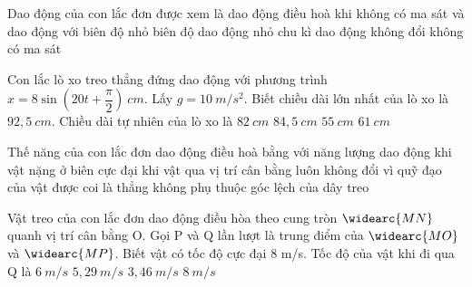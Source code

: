	\begin{ex} %
		Dao động của con lắc đơn được xem là dao động điều hoà khi
		\choice
		{\True không có ma sát và dao động với biên độ nhỏ}
		{biên độ dao động nhỏ}
		{chu kì dao động không đổi}
		{không có ma sát}
	\end{ex}
	\begin{ex}%
		Con lắc lò xo treo thẳng đứng dao động với phương trình $x=8\sin \left( 20t+\dfrac{\pi}{2} \right)\ cm.$ Lấy $g = 10\ m/s^2$. Biết chiều dài lớn nhất của lò xo là $92,5\ cm$. Chiều dài tự nhiên của lò xo là
		\choice
		{\True $82\ cm$}
		{$84,5\ cm$}
		{$55\ cm$}
		{$61\ cm$}
	\end{ex}
	\begin{ex} %
		Thế năng của con lắc đơn dao động điều hoà
		\choice
		{\True bằng với năng lượng dao động khi vật nặng ở biên}
		{cực đại khi vật qua vị trí cân bằng}
		{luôn không đổi vì quỹ đạo của vật được coi là thẳng}
		{không phụ thuộc góc lệch của dây treo}
	\end{ex}
	\begin{ex}%
		Vật treo của con lắc đơn dao động điều hòa theo cung tròn $\widearc{MN}$ quanh vị trí cân bằng O. Gọi P và Q lần lượt là trung điểm của $\widearc{MO}$ và $\widearc{MP}$. Biết vật có tốc độ cực đại 8 m/s. Tốc độ của vật khi đi qua Q là
		\choice
		{$6\ m/s$}
		{\True $5,29\ m/s$}
		{$3,46\ m/s$}
		{$8\ m/s$}
	\end{ex}
	

